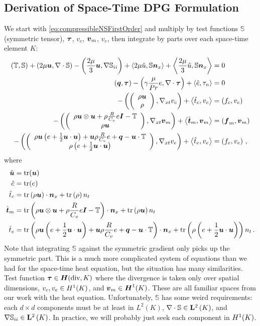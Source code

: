 \documentclass[Proposal.tex]{subfiles}
\begin{document}
\subsection{Derivation of Space-Time DPG Formulation}
We start with \eqref{eq:compressibleNSFirstOrder} and multiply by test functions $\mathbb{S}$ (symmetric tensor), $\boldsymbol\tau$, $v_c$, $\boldsymbol v_m$, $v_e$, 
then integrate by parts over each space-time element $K$:
\begin{subequations}
\label{eq:compressibleNSBF}
\begin{align}
	\left( \mathbb{T},\mathbb{S} \right)+\left( 2\mu\boldsymbol u,\nabla\cdot\mathbb{S} \right)-\left( \frac{2\mu}{3}\boldsymbol u,\nabla\mathbb{S}_{ii} \right)
	+\left\langle 2\mu\hat u,\mathbb{S}\boldsymbol n_x \right\rangle+\left\langle \frac{2\mu}{3}\hat u,\mathbb{S}\boldsymbol n_x \right\rangle&=0\\
	\left( \boldsymbol q,\boldsymbol\tau \right)-\left( \gamma\frac{\mu}{Pr}e,\nabla\cdot\boldsymbol\tau \right)+\left\langle \hat e,\tau_n \right\rangle&=0\\
	-\left( \left( \begin{array}{c} \rho\boldsymbol u\\ \rho\\ \end{array} \right),\nabla_{xt} v_c \right)+\left\langle \hat t_c,v_c \right\rangle&=\left( f_c,v_c \right)\\
	-\left( \left( \begin{array}{c} \rho\boldsymbol u\otimes\boldsymbol u+\rho\frac{R}{C_v}e\boldsymbol I-\mathbb{T}\\ \rho\boldsymbol u\\ \end{array} \right),\nabla_{xt}\boldsymbol v_m \right)+\left\langle \hat{\boldsymbol t}_m,\boldsymbol v_m \right\rangle&=\left( \boldsymbol f_m,\boldsymbol v_m \right)\\
	-\left( \left( \begin{array}{c} \rho\boldsymbol u\left( e+\frac{1}{2}\boldsymbol u\cdot\boldsymbol u \right)+\boldsymbol u\rho\frac{R}{C_v}e+\boldsymbol q-\boldsymbol u\cdot\mathbb{T}\\ \rho\left( e+\frac{1}{2}\boldsymbol u\cdot\boldsymbol u \right)\\ \end{array} \right),\nabla_{xt} v_e \right)
	+\left\langle \hat t_e,v_e \right\rangle&=\left( f_e,v_e \right)\,,
\end{align}
\end{subequations}
where 
\begin{equation*}
\begin{aligned}
\hat{\boldsymbol u}&=\operatorname*{tr}(\boldsymbol u)\\
\hat e&=\operatorname*{tr}(e)\\
\hat t_c&=\operatorname*{tr}\left( \rho\boldsymbol u \right)\cdot\boldsymbol n_x
+\operatorname*{tr}\left( \rho \right)n_t\\
\hat{\boldsymbol t}_m&=\operatorname*{tr}\left( \rho\boldsymbol u\otimes\boldsymbol u+\rho\frac{R}{C_v}e\boldsymbol I-\mathbb{T} \right)\cdot\boldsymbol n_x
+\operatorname*{tr}\left( \rho\boldsymbol u \right) n_t\\
\hat t_e&=\operatorname*{tr}\left( \rho\boldsymbol u\left( e+\frac{1}{2}\boldsymbol u\cdot\boldsymbol u \right)+\boldsymbol u\rho\frac{R}{C_v}e+\boldsymbol q-\boldsymbol u\cdot\mathbb{T} \right)\cdot\boldsymbol n_x
+\operatorname*{tr}\left( \rho\left( e+\frac{1}{2}\boldsymbol u\cdot\boldsymbol u \right) \right)n_t\,.
\end{aligned}
\end{equation*}
Note that integrating $\mathbb{S}$ against the symmetric gradient only picks up the symmetric part.
This is a much more complicated system of equations than we had for the space-time heat equation, but the situation has many similarities.
Test function $\boldsymbol\tau\in\mbox{\boldmath $H$}(\text{div},K)$ where the divergence is taken only over spatial dimensions, $v_c,v_e\in H^{1}(K)$, and $\boldsymbol v_m\in\mbox{\boldmath $H$}^{1}(K)$.
These are all familiar spaces from our work with the heat equation.
Unfortunately, $\mathbb{S}$ has some weird requirements: each $d\times d$ components must be at least in $L^2(K)$, $\nabla\cdot\mathbb{S}\in\mathbf{L}^2\left( K \right)$, and
$\nabla\mathbb{S}_{ii}\in\mathbf{L}^2\left( K \right)$.
In practice, we will probably just seek each component in $H^{1}(K)$.
\end{document}
